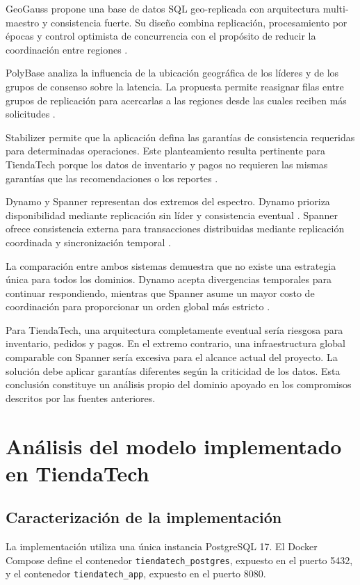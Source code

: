 \documentclass[11pt,a4paper]{article}
\begin{document}
GeoGauss propone una base de datos SQL geo-replicada con arquitectura multi-maestro y consistencia fuerte. Su diseño combina replicación, procesamiento por épocas y control optimista de concurrencia con el propósito de reducir la coordinación entre regiones \cite{zhou2023}.

PolyBase analiza la influencia de la ubicación geográfica de los líderes y de los grupos de consenso sobre la latencia. La propuesta permite reasignar filas entre grupos de replicación para acercarlas a las regiones desde las cuales reciben más solicitudes \cite{ruan2024}.

Stabilizer permite que la aplicación defina las garantías de consistencia requeridas para determinadas operaciones. Este planteamiento resulta pertinente para TiendaTech porque los datos de inventario y pagos no requieren las mismas garantías que las recomendaciones o los reportes \cite{li2022}.

Dynamo y Spanner representan dos extremos del espectro. Dynamo prioriza disponibilidad mediante replicación sin líder y consistencia eventual \cite{decandia2007}. Spanner ofrece consistencia externa para transacciones distribuidas mediante replicación coordinada y sincronización temporal \cite{corbett2013}.

La comparación entre ambos sistemas demuestra que no existe una estrategia única para todos los dominios. Dynamo acepta divergencias temporales para continuar respondiendo, mientras que Spanner asume un mayor costo de coordinación para proporcionar un orden global más estricto \cite{corbett2013,decandia2007}.

Para TiendaTech, una arquitectura completamente eventual sería riesgosa para inventario, pedidos y pagos. En el extremo contrario, una infraestructura global comparable con Spanner sería excesiva para el alcance actual del proyecto. La solución debe aplicar garantías diferentes según la criticidad de los datos. Esta conclusión constituye un análisis propio del dominio apoyado en los compromisos descritos por las fuentes anteriores.

\section{Análisis del modelo implementado en TiendaTech}

\subsection{Caracterización de la implementación}
La implementación utiliza una única instancia PostgreSQL 17. El Docker Compose define el contenedor \texttt{tiendatech\_postgres}, expuesto en el puerto 5432, y el contenedor \texttt{tiendatech\_app}, expuesto en el puerto 8080.
\end{document}
